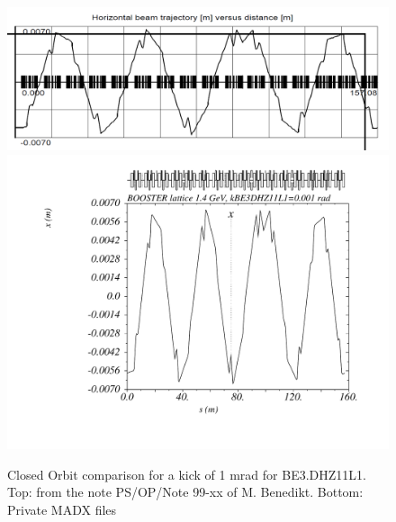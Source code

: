 \documentclass[11pt,letter,english]{article}
\begin{document}
\begin{figure}[!hbtp]
  \begin{center}
    \includegraphics[width=1.0\textwidth]{figs/LINC-BE_DHZ11L1.png}
    \includegraphics[width=1.0\textwidth]{figs/psb_orbit_BE3DHZ11L1at1mrad.pdf}
    \caption{Closed Orbit comparison for a kick of 1 mrad for BE3.DHZ11L1. Top: from the note PS/OP/Note 99-xx of M. Benedikt. Bottom: Private MADX files}
    \label{fig:BE_DHZ11L1}
  \end{center}
\end{figure}
\end{document}
